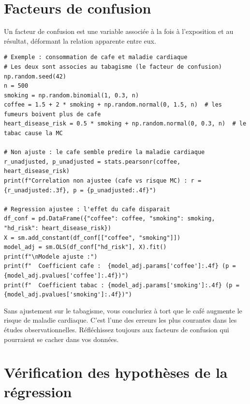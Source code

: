 \section{Facteurs de confusion}

Un facteur de confusion est une variable associ\'ee \`a la fois \`a l'exposition et au r\'esultat, d\'eformant la relation apparente entre eux.

\begin{verbatim}
# Exemple : consommation de cafe et maladie cardiaque
# Les deux sont associes au tabagisme (le facteur de confusion)
np.random.seed(42)
n = 500
smoking = np.random.binomial(1, 0.3, n)
coffee = 1.5 + 2 * smoking + np.random.normal(0, 1.5, n)  # les fumeurs boivent plus de cafe
heart_disease_risk = 0.5 * smoking + np.random.normal(0, 0.3, n)  # le tabac cause la MC

# Non ajuste : le cafe semble predire la maladie cardiaque
r_unadjusted, p_unadjusted = stats.pearsonr(coffee, heart_disease_risk)
print(f"Correlation non ajustee (cafe vs risque MC) : r = {r_unadjusted:.3f}, p = {p_unadjusted:.4f}")

# Regression ajustee : l'effet du cafe disparait
df_conf = pd.DataFrame({"coffee": coffee, "smoking": smoking, "hd_risk": heart_disease_risk})
X = sm.add_constant(df_conf[["coffee", "smoking"]])
model_adj = sm.OLS(df_conf["hd_risk"], X).fit()
print(f"\nModele ajuste :")
print(f"  Coefficient cafe :  {model_adj.params['coffee']:.4f} (p = {model_adj.pvalues['coffee']:.4f})")
print(f"  Coefficient tabac : {model_adj.params['smoking']:.4f} (p = {model_adj.pvalues['smoking']:.4f})")
\end{verbatim}

\begin{warningbox}
Sans ajustement sur le tabagisme, vous concluriez \`a tort que le caf\'e augmente le risque de maladie cardiaque. C'est l'une des erreurs les plus courantes dans les \'etudes observationnelles. R\'efl\'echissez toujours aux facteurs de confusion qui pourraient se cacher dans vos donn\'ees.
\end{warningbox}

\section{V\'erification des hypoth\`eses de la r\'egression}

